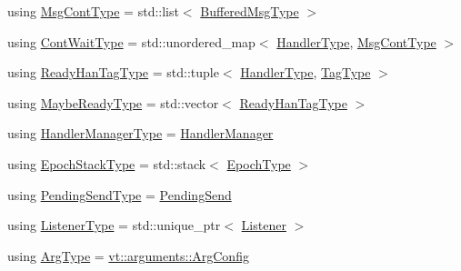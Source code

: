 \begin{DoxyCompactItemize}
\item 
using \hyperlink{structvt_1_1messaging_1_1_active_messenger_a18bbfbf9ecd82b33f6fc475b2e5290a5}{Msg\+Cont\+Type} = std\+::list$<$ \hyperlink{structvt_1_1messaging_1_1_active_messenger_a80a9cbda399d7bf035bfcecc761f4b02}{Buffered\+Msg\+Type} $>$
\item 
using \hyperlink{structvt_1_1messaging_1_1_active_messenger_a1c52f4ec0c93821191cb3e69dc7c8604}{Cont\+Wait\+Type} = std\+::unordered\+\_\+map$<$ \hyperlink{namespacevt_af64846b57dfcaf104da3ef6967917573}{Handler\+Type}, \hyperlink{structvt_1_1messaging_1_1_active_messenger_a18bbfbf9ecd82b33f6fc475b2e5290a5}{Msg\+Cont\+Type} $>$
\item 
using \hyperlink{structvt_1_1messaging_1_1_active_messenger_a98bb74aa4a561161dd7c7073dcd5f1d3}{Ready\+Han\+Tag\+Type} = std\+::tuple$<$ \hyperlink{namespacevt_af64846b57dfcaf104da3ef6967917573}{Handler\+Type}, \hyperlink{namespacevt_a84ab281dae04a52a4b243d6bf62d0e52}{Tag\+Type} $>$
\item 
using \hyperlink{structvt_1_1messaging_1_1_active_messenger_a745d5e8cad8c2f67d20479afacc6e134}{Maybe\+Ready\+Type} = std\+::vector$<$ \hyperlink{structvt_1_1messaging_1_1_active_messenger_a98bb74aa4a561161dd7c7073dcd5f1d3}{Ready\+Han\+Tag\+Type} $>$
\item 
using \hyperlink{structvt_1_1messaging_1_1_active_messenger_ac7e9165df6550ea333f8eb018a5a0e60}{Handler\+Manager\+Type} = \hyperlink{structvt_1_1_handler_manager}{Handler\+Manager}
\item 
using \hyperlink{structvt_1_1messaging_1_1_active_messenger_a746358029c37dabf2b4c8ad26642aee9}{Epoch\+Stack\+Type} = std\+::stack$<$ \hyperlink{namespacevt_a985a5adf291c34a3ca263b3378388236}{Epoch\+Type} $>$
\item 
using \hyperlink{structvt_1_1messaging_1_1_active_messenger_a3626a6ca76d8ad4ec7c3b47a2c70d3a8}{Pending\+Send\+Type} = \hyperlink{structvt_1_1messaging_1_1_pending_send}{Pending\+Send}
\item 
using \hyperlink{structvt_1_1messaging_1_1_active_messenger_a63878fd4ef1fbc505bd1313d32049ca9}{Listener\+Type} = std\+::unique\+\_\+ptr$<$ \hyperlink{structvt_1_1messaging_1_1_listener}{Listener} $>$
\item 
using \hyperlink{structvt_1_1messaging_1_1_active_messenger_a62cdeb842610617f316e6b20c19c5031}{Arg\+Type} = \hyperlink{structvt_1_1arguments_1_1_arg_config}{vt\+::arguments\+::\+Arg\+Config}
\end{DoxyCompactItemize}
